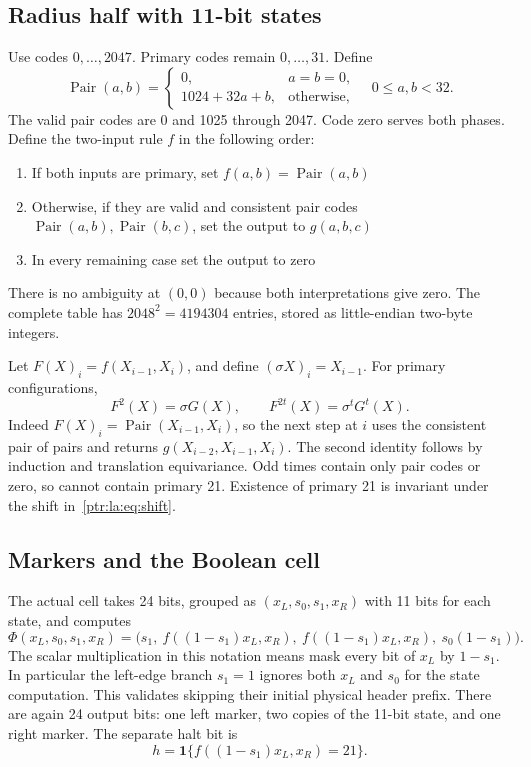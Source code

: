 \documentclass[11pt,letterpaper]{article}
\theoremstyle{definition}\newtheorem{definition}[theorem]{Definition}
\theoremstyle{remark}\newtheorem{remark}[theorem]{Remark}
\newcommand{\ind}{\mathbf 1}\newcommand{\dom}{\operatorname{dom}}
\newcommand{\Pair}{\operatorname{Pair}}\newcommand{\NAND}{\operatorname{NAND}}
\begin{document}
\subsection{Radius half with 11-bit states}
Use codes $0,\ldots,2047$. Primary codes remain $0,\ldots,31$. Define
\[
 \Pair(a,b)=\begin{cases}0,&a=b=0,\\1024+32a+b,&\text{otherwise},\end{cases}
 \quad 0\le a,b<32.
\]
The valid pair codes are 0 and 1025 through 2047. Code zero serves both phases. Define the two-input rule $f$ in the following order:
\begin{enumerate}
\item If both inputs are primary, set $f(a,b)=\Pair(a,b)$
\item Otherwise, if they are valid and consistent pair codes $\Pair(a,b),\Pair(b,c)$, set the output to $g(a,b,c)$
\item In every remaining case set the output to zero
\end{enumerate}
There is no ambiguity at $(0,0)$ because both interpretations give zero. The complete table has $2048^2=4194304$ entries, stored as little-endian two-byte integers.

Let $F(X)_i=f(X_{i-1},X_i)$, and define $(\sigma X)_i=X_{i-1}$. For primary configurations,
\begin{equation}\label{ptr:la:eq:shift}
 F^2(X)=\sigma G(X),\qquad F^{2t}(X)=\sigma^tG^t(X).
\end{equation}
Indeed $F(X)_i=\Pair(X_{i-1},X_i)$, so the next step at $i$ uses the consistent pair of pairs and returns $g(X_{i-2},X_{i-1},X_i)$. The second identity follows by induction and translation equivariance. Odd times contain only pair codes or zero, so cannot contain primary 21. Existence of primary 21 is invariant under the shift in~\eqref{ptr:la:eq:shift}.

\subsection{Markers and the Boolean cell}
The actual cell takes 24 bits, grouped as $(x_L,s_0,s_1,x_R)$ with 11 bits for each state, and computes
\begin{equation}\label{ptr:la:eq:phi}
 \Phi(x_L,s_0,s_1,x_R)
 =\bigl(s_1,\ f((1-s_1)x_L,x_R),\ f((1-s_1)x_L,x_R),\ s_0(1-s_1)\bigr).
\end{equation}
The scalar multiplication in this notation means mask every bit of $x_L$ by $1-s_1$. In particular the left-edge branch $s_1=1$ ignores both $x_L$ and $s_0$ for the state computation. This validates skipping their initial physical header prefix. There are again 24 output bits: one left marker, two copies of the 11-bit state, and one right marker. The separate halt bit is
\[
 h=\ind\{f((1-s_1)x_L,x_R)=21\}.
\]
\end{document}
